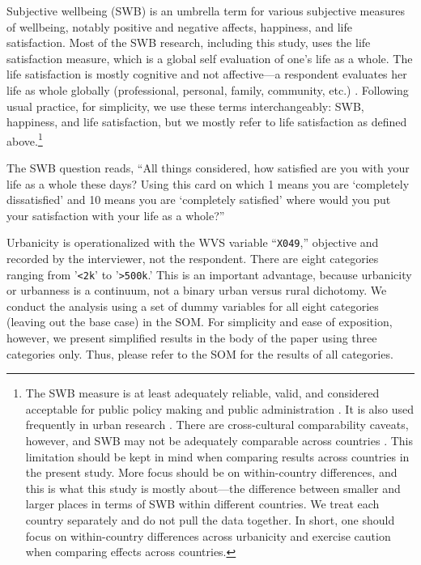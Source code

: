\documentclass[11pt, letterpaper]{article}
\begin{document}
Subjective wellbeing (SWB) is an umbrella term for various subjective measures
of wellbeing, notably positive and negative affects, happiness, and life
satisfaction. Most of the SWB research, including this study, uses the life
satisfaction measure, which is a global self evaluation of one's life as a
whole. The life satisfaction is mostly cognitive and not affective---a respondent
evaluates her life as whole globally (professional, personal, family, community,
etc.) %
 \citep[%
 ][]{diener09}.
Following usual practice, for simplicity, we use these terms interchangeably:
SWB, happiness, and life satisfaction, but we mostly refer to life satisfaction
as defined above.\footnote{The SWB measure is at least adequately reliable, valid, and considered
acceptable for public policy making and public administration
\citep{diener09,stiglitz09al}. It is also used frequently in urban research \citep[e.g.,][]{moeinaddini20,mouratidis19,wang19,anon17-cities-oslo,ma17,wkeziak16,valente16,chen15}.
 There are cross-cultural comparability caveats, however, and SWB may not be
adequately comparable across countries \citep{kahneman99,diener09}. This limitation should be kept in mind when comparing results across countries in the present study. More focus should be on within-country differences, and this is what this study is mostly about---the difference between smaller and larger places in terms of SWB
within different countries. We treat each country separately and do not pull the data together. In short, one should focus on within-country differences across urbanicity and exercise caution when comparing effects across countries.} 


The SWB question reads, ``All things considered, how  satisfied are you with your life as a whole these days? Using this card on which 1 means you are `completely dissatisfied' and 10 means you are `completely satisfied' where would you put your satisfaction with your life as a whole?''

Urbanicity is operationalized with the WVS variable ``\texttt{X049},'' objective and recorded by the interviewer, not the respondent.
There are eight categories ranging from '\texttt{<2k}' to '\texttt{>500k}.' This is an
important advantage, because %
urbanicity or urbanness is a
continuum, not a binary urban versus rural dichotomy. We conduct the analysis using a
set of dummy variables for all eight categories (leaving out the base case) in
the SOM. For simplicity and ease of exposition, however,  we present simplified results in the body of the paper using three categories only.
Thus, please refer to the SOM for the results of all categories.
\end{document}
